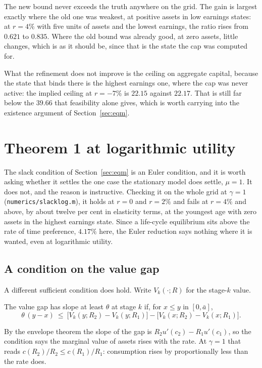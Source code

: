The new bound never exceeds the truth anywhere on the grid. The gain is largest exactly where the
old one was weakest, at positive assets in low earnings states: at $r=4\%$ with five units of
assets and the lowest earnings, the ratio rises from $0.621$ to $0.835$. Where the old bound was
already good, at zero assets, little changes, which is as it should be, since that is the state
the cap was computed for.

What the refinement does not improve is the ceiling on aggregate capital, because the state that
binds there is the highest earnings one, where the cap was never active: the implied ceiling at
$r=-7\%$ is $22.15$ against $22.17$. That is still far below the $39.66$ that feasibility alone
gives, which is worth carrying into the existence argument of Section~\ref{sec:eqm}.

\section{Theorem 1 at logarithmic utility}\label{sec:log}

The slack condition of Section~\ref{sec:eqm} is an Euler condition, and it is worth asking whether
it settles the one case the stationary model does settle, $\mu=1$. It does not, and the reason is
instructive. Checking it on the whole grid at $\gamma=1$ (\texttt{numerics/slacklog.m}), it holds
at $r=0$ and $r=2\%$ and fails at $r=4\%$ and above, by about twelve per cent in elasticity terms,
at the youngest age with zero assets in the highest earnings state. Since a life-cycle equilibrium
sits above the rate of time preference, $4.17\%$ here, the Euler reduction says nothing where it
is wanted, even at logarithmic utility.

\subsection{A condition on the value gap}

A different sufficient condition does hold. Write $V_k(\cdot;R)$ for the stage-$k$ value.

\begin{definition}\label{def:gap}
The value gap has slope at least $\theta$ at stage $k$ if, for $x\le y$ in $[0,\bar a]$,
\[
  \theta\,(y-x)\ \le\ \bigl[V_k(y;R_2)-V_k(y;R_1)\bigr]-\bigl[V_k(x;R_2)-V_k(x;R_1)\bigr].
\]
\end{definition}

By the envelope theorem the slope of the gap is $R_2u'(c_2)-R_1u'(c_1)$, so the condition says the
marginal value of assets rises with the rate. At $\gamma=1$ that reads $c(R_2)/R_2\le c(R_1)/R_1$:
consumption rises by proportionally less than the rate does.

